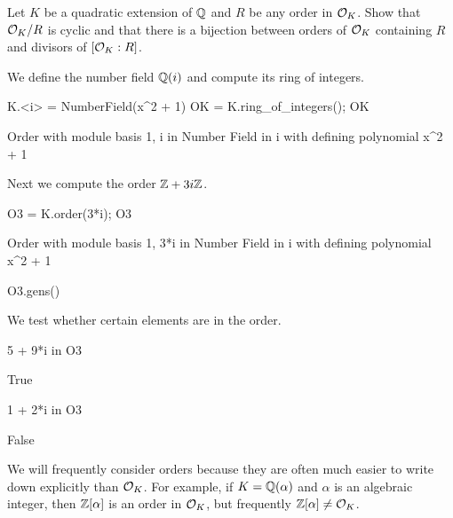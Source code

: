 \begin{exercise}
	Let $K$ be a quadratic extension of $\mathbb{Q}$
	and $R$ be any order in $\mathcal{O}_K$.
	Show that $\mathcal{O}_K/R$ is cyclic and that there is
	a bijection between orders of $\mathcal{O}_K$ containing $R$
	and divisors of $[\mathcal{O}_K:R]$.
\end{exercise}

We define the number field $\mathbb{Q}(i)$ and compute its
ring of integers.
\begin{sagecode}
\begin{sagecell}
K.<i> = NumberField(x^2 + 1)
OK = K.ring_of_integers(); OK
\end{sagecell}
\begin{sageout}
Order with module basis 1, i in Number Field in i with 
defining polynomial x^2 + 1
\end{sageout}
\end{sagecode}

\noindent Next we compute the order $\mathbb{Z} + 3i \mathbb{Z}$.
\begin{sagecode}
\begin{sagecell}
O3 = K.order(3*i); O3
\end{sagecell}
\begin{sageout}
Order with module basis 1, 3*i in Number Field in i with 
defining polynomial x^2 + 1
\end{sageout}
\begin{sagecell}
O3.gens()
\end{sagecell}
\begin{sageout}
[1, 3*i]
\end{sageout}
\end{sagecode}


\noindent We test whether certain elements are in the order.
\begin{sagecode}
\begin{sagecell}
5 + 9*i in O3
\end{sagecell}
\begin{sageout}
True
\end{sageout}
\begin{sagecell}
1 + 2*i in O3
\end{sagecell}
\begin{sageout}
False
\end{sageout}
\end{sagecode}


We will frequently consider orders because they are often much easier
to write down explicitly than $\mathcal{O}_K$.  For example, if $K=\mathbb{Q}(\alpha)$
and $\alpha$ is an algebraic integer, then $\mathbb{Z}[\alpha]$ is an order in
$\mathcal{O}_K$, but frequently $\mathbb{Z}[\alpha]\neq \mathcal{O}_K$.

